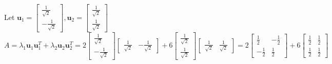 \documentclass[12pt]{book}
\begin{document}
\begin{CJK}{UTF8}{bsmi}
\begin{minipage}[t]{\dimexpr\linewidth}
\begin{minipage}[t]{\dimexpr\linewidth}
Let $\displaystyle\textbf{u}_1=\begin{bmatrix}
\frac{1}{\sqrt{2}} \\ -\frac{1}{\sqrt{2}}
\end{bmatrix}, \textbf{u}_2=\begin{bmatrix}
\frac{1}{\sqrt{2}} \\ \frac{1}{\sqrt{2}}
\end{bmatrix}$ \\
$A=\lambda_1\textbf{u}_1\textbf{u}_1^T+\lambda_2\textbf{u}_2\textbf{u}_2^T
=2\begin{bmatrix}
\frac{1}{\sqrt{2}} \\ -\frac{1}{\sqrt{2}}
\end{bmatrix}\begin{bmatrix}
\frac{1}{\sqrt{2}} & -\frac{1}{\sqrt{2}}
\end{bmatrix}+6\begin{bmatrix}
\frac{1}{\sqrt{2}} \\ \frac{1}{\sqrt{2}}
\end{bmatrix}\begin{bmatrix}
\frac{1}{\sqrt{2}} & \frac{1}{\sqrt{2}}
\end{bmatrix}
=2\begin{bmatrix}
\frac{1}{2} & -\frac{1}{2} \\
-\frac{1}{2} & \frac{1}{2}
\end{bmatrix}+6\begin{bmatrix}
\frac{1}{2} & \frac{1}{2} \\
\frac{1}{2} & \frac{1}{2}
\end{bmatrix}$
\end{minipage} \\


\end{minipage}
\end{CJK}
\end{document}

